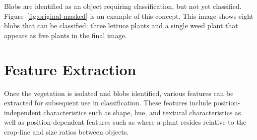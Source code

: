 \documentclass[letterpaper]{article}
\begin{document}
{{Blobs are identified as an object requiring classification, but not yet classified. Figure~\ref{fig:original-masked} is an example of this concept. This image shows eight blobs that can be classified: three lettuce plants and a single weed plant that appears as five plants in the final image.

\section{Feature Extraction}
Once the vegetation is isolated and blobs identified, various features can be extracted for subsequent use in classification. These features include position-independent characteristics such as shape, hue, and textural characteristics as well as position-dependent features such as where a plant resides relative to the crop-line and size ratios between objects.  

}}
\end{document}
